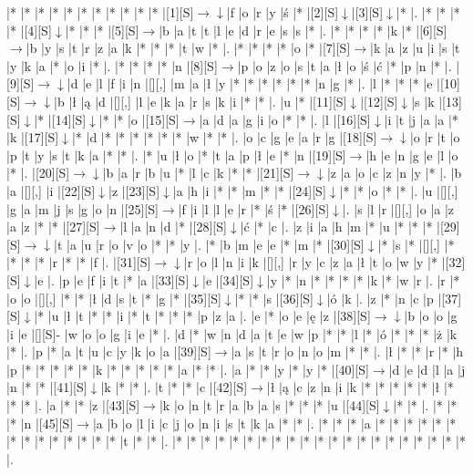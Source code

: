 \documentclass[11pt]{article}
\newcommand\drarr{$\rightarrow \!\!\!\!\! \downarrow$}
\newcommand\rarr{$\rightarrow$}
\newcommand\darr{$\downarrow$}
\begin{document}
\noindent\begin{Puzzle}{20}{30}|*	|*	|*	|*	|*	|*	|*	|*	|*	|*	|*	|[1][S]\drarr	|f	|o	|r	|y	|ś	|*	|[2][S]\darr	|[3][S]\darr	|*	|.
|*	|*	|*	|*	|[4][S]\darr	|*	|*	|*	|[5][S]\rarr	|b	|a	|t	|t	|l	|e	|d	|r	|e	|s	|s	|*	|.
|*	|*	|*	|*	|k	|*	|[6][S]\rarr	|b	|y	|s	|t	|r	|z	|a	|k	|*	|*	|*	|t	|w	|*	|.
|*	|*	|*	|*	|o	|*	|[7][S]\rarr	|k	|a	|z	|u	|i	|s	|t	|y	|k	|a	|*	|o	|i	|*	|.
|*	|*	|*	|*	|n	|[8][S]\rarr	|p	|o	|z	|o	|s	|t	|a	|ł	|o	|ś	|ć	|*	|p	|n	|*	|.
|[9][S]\drarr	|d	|e	|l	|f	|i	|n	|[][,]{ }	|m	|a	|ł	|y	|*	|*	|*	|*	|*	|*	|n	|g	|*	|.
|l	|*	|*	|*	|e	|[10][S]\drarr	|b	|ł	|ą	|d	|[][,]{ }	|l	|e	|k	|a	|r	|s	|k	|i	|*	|*	|.
|u	|*	|[11][S]\darr	|[12][S]\darr	|s	|k	|[13][S]\darr	|*	|[14][S]\darr	|*	|*	|o	|[15][S]\rarr	|a	|d	|a	|g	|i	|o	|*	|*	|.
|l	|[16][S]\darr	|i	|t	|j	|a	|a	|*	|k	|[17][S]\darr	|*	|d	|*	|*	|*	|*	|*	|*	|w	|*	|*	|.
|o	|c	|g	|e	|a	|r	|g	|[18][S]\drarr	|o	|r	|t	|o	|p	|t	|y	|s	|t	|k	|a	|*	|*	|.
|*	|u	|ł	|o	|*	|t	|a	|p	|ł	|e	|*	|n	|[19][S]\rarr	|h	|e	|n	|g	|e	|l	|o	|*	|.
|[20][S]\drarr	|b	|a	|r	|b	|u	|*	|l	|c	|k	|*	|*	|[21][S]\drarr	|z	|a	|o	|c	|z	|n	|y	|*	|.
|b	|a	|[][,]{ }	|i	|[22][S]\darr	|z	|[23][S]\darr	|a	|h	|i	|*	|*	|m	|*	|*	|[24][S]\darr	|*	|*	|o	|*	|*	|.
|u	|[][,]{ }	|g	|a	|m	|j	|s	|g	|o	|n	|[25][S]\rarr	|f	|i	|l	|l	|e	|r	|*	|ś	|*	|[26][S]\darr	|.
|s	|l	|r	|[][,]{ }	|o	|a	|z	|a	|z	|*	|*	|[27][S]\rarr	|l	|a	|n	|d	|*	|[28][S]\darr	|ć	|*	|c	|.
|z	|i	|a	|h	|m	|*	|u	|*	|*	|*	|[29][S]\drarr	|t	|a	|u	|r	|o	|v	|o	|*	|*	|y	|.
|*	|b	|m	|e	|e	|*	|m	|*	|[30][S]\darr	|*	|s	|*	|[][,]{ }	|*	|*	|*	|*	|r	|*	|*	|f	|.
|[31][S]\drarr	|r	|o	|l	|n	|i	|k	|[][,]{ }	|r	|y	|c	|z	|a	|ł	|t	|o	|w	|y	|*	|[32][S]\darr	|e	|.
|p	|e	|f	|i	|t	|*	|a	|[33][S]\darr	|e	|[34][S]\darr	|y	|*	|n	|*	|*	|*	|*	|k	|*	|w	|r	|.
|r	|*	|o	|o	|[][,]{ }	|*	|*	|ł	|d	|s	|t	|*	|g	|*	|[35][S]\darr	|*	|*	|s	|[36][S]\darr	|ó	|k	|.
|z	|*	|n	|c	|p	|[37][S]\darr	|*	|u	|ł	|t	|*	|*	|i	|*	|t	|*	|*	|*	|p	|z	|a	|.
|e	|*	|o	|e	|ę	|z	|[38][S]\drarr	|b	|o	|o	|g	|i	|e	|[][S]-	|w	|o	|o	|g	|i	|e	|*	|.
|d	|*	|w	|n	|d	|a	|t	|e	|w	|p	|*	|*	|l	|*	|ó	|*	|*	|*	|ż	|k	|*	|.
|p	|*	|a	|t	|u	|c	|y	|k	|o	|a	|[39][S]\rarr	|a	|s	|t	|r	|o	|n	|o	|m	|*	|*	|.
|ł	|*	|*	|r	|*	|h	|p	|*	|*	|*	|*	|*	|k	|*	|*	|*	|*	|*	|a	|*	|*	|.
|a	|*	|*	|y	|*	|y	|*	|[40][S]\rarr	|d	|e	|d	|l	|a	|j	|n	|*	|*	|[41][S]\darr	|k	|*	|*	|.
|t	|*	|*	|c	|[42][S]\rarr	|ł	|ą	|c	|z	|n	|i	|k	|*	|*	|*	|*	|*	|ł	|*	|*	|*	|.
|a	|*	|*	|z	|[43][S]\rarr	|k	|o	|n	|t	|r	|a	|b	|a	|s	|*	|*	|*	|u	|[44][S]\darr	|*	|*	|.
|*	|*	|*	|n	|[45][S]\rarr	|a	|b	|o	|l	|i	|c	|j	|o	|n	|i	|s	|t	|k	|a	|*	|*	|.
|*	|*	|*	|a	|*	|*	|*	|*	|*	|*	|*	|*	|*	|*	|*	|*	|*	|*	|t	|*	|*	|.
|*	|*	|*	|*	|*	|*	|*	|*	|*	|*	|*	|*	|*	|*	|*	|*	|*	|*	|*	|*	|*	|.\end{Puzzle}
\end{document}
